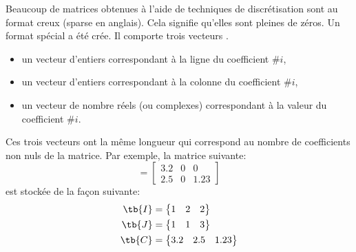\bexo

Beaucoup de matrices obtenues à l'aide de techniques de discrétisation sont au format creux (sparse en anglais). Cela signifie qu'elles sont pleines de zéros. Un format spécial a été crée. Il comporte trois vecteurs . \begin{itemize}
	\item un vecteur  d'entiers correspondant à la ligne du coefficient \#$i$,
	\item un vecteur  d'entiers correspondant à la colonne du coefficient  \#$i$, 
	\item un vecteur  de nombre réels (ou complexes) correspondant à la valeur du coefficient \#$i$.
\end{itemize}
Ces trois vecteurs ont la même longueur qui correspond au nombre de coefficients non nuls de la matrice. Par exemple, la matrice suivante:
\begin{equation}
	[\tb{M}]=\begin{bmatrix}
		3.2 & 0 &0\\
		2.5&0 &1.23
	\end{bmatrix}
\end{equation}
est stockée de la façon suivante:
\begin{align}
	\tb{I}&=\begin{Bmatrix}
		1 & 2 & 2
	\end{Bmatrix}\\
	\tb{J}&=\begin{Bmatrix}
		1 & 1 & 3
	\end{Bmatrix}\\
	\tb{C}&=\begin{Bmatrix}
		3.2 & 2.5 & 1.23
	\end{Bmatrix}\\
\end{align} 

